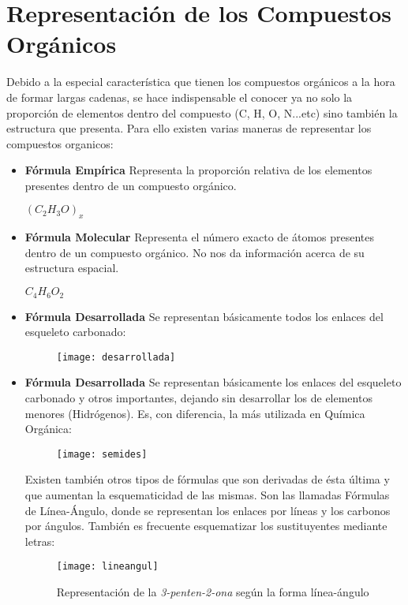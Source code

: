 \section{Representación de los Compuestos Orgánicos}
Debido a la especial característica que tienen los compuestos orgánicos a la hora de formar largas cadenas, se hace indispensable el conocer ya no solo la proporción de elementos dentro del compuesto (C, H, O, N...etc) sino también la estructura que presenta. Para ello existen varias maneras de representar los compuestos organicos:
\begin{itemize}
	\item \textbf{Fórmula Empírica} Representa la proporción relativa de los elementos presentes dentro de un compuesto orgánico. 
	\begin{center}
		$(C_2H_3O)_x$
	\end{center}
	\item \textbf{Fórmula Molecular} Representa el número exacto de átomos presentes dentro de un compuesto orgánico. No nos da información acerca de su estructura espacial.
	\begin{center}
		$C_4H_6O_2$
	\end{center}
		\item \textbf{Fórmula Desarrollada} Se representan básicamente todos los enlaces del esqueleto carbonado:
		\begin{figure}[h!]
			\centering
			\texttt{[image: desarrollada]}
		\end{figure}
		\item \textbf{Fórmula Desarrollada} Se representan básicamente los enlaces del esqueleto carbonado y otros importantes, dejando sin desarrollar los de elementos menores (Hidrógenos). Es, con diferencia, la más utilizada en Química Orgánica:
			\begin{figure}[h!]
			\centering
			\texttt{[image: semides]}
		\end{figure}
		Existen también otros tipos de fórmulas que son derivadas de ésta última y que aumentan la esquematicidad de las mismas. Son las llamadas Fórmulas de Línea-Ángulo, donde se representan los enlaces por líneas y los carbonos por ángulos. También es frecuente esquematizar los sustituyentes mediante letras:
		\begin{figure}[h!]
			\centering
			\texttt{[image: lineangul]}
			\caption{Representación de la \emph{3-penten-2-ona} según la forma línea-ángulo}
		\end{figure}  
\end{itemize}

